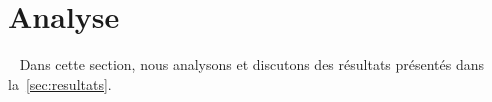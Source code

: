 \section{Analyse}~\label{sec:analyse}
Dans cette section, nous analysons et discutons des résultats présentés dans la~\autoref{sec:resultats}.
